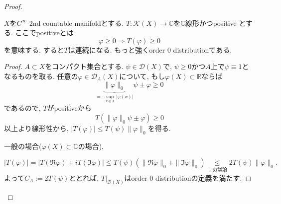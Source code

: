 \begin{proof}
\begin{tcolorbox}[mybox]
\begin{thm}
\end{thm}
\end{tcolorbox}

\begin{rem}
$X$を$C^{\infty}$ 2nd countable manifoldとする. 
$T:\mathcal{K}(X)\to \mathbb{C}$を$\mathbb{C}$線形かつpositive とする.
ここでpositiveとは
\[
\varphi\geq 0 \Rightarrow T(\varphi)\geq 0
\]
を意味する. すると$T$は連続になる. もっと強くorder $0$ distributionである. 
\begin{proof}
$A\subset X$をコンパクト集合とする. 
 $\psi\in \mathcal{D}(X)$で, $\psi\geq 0$かつ$A$上で$\psi \equiv 1$となるものを取る. 
任意の$\varphi\in \mathcal{D}_A(X)$について, 
もし$\varphi(X)\subset \mathbb{R}$ならば
\[
\underbrace{\|\varphi\|_0}_{=:\sup_{x\in X} |\varphi(x)|}\psi \pm \varphi \geq 0
\]
であるので, $T$がpositiveから
\[
T(\|\varphi\|_0\psi \pm \varphi)\geq 0
\]
以上より線形性から, 
\( |T(\varphi)|\leq T(\psi)\|\varphi\|_0
\)を得る.

一般の場合($\varphi(X)\subset \mathbb{C}$の場合), 

\[
|T(\varphi)|=\left|T(\Re\varphi)+iT(\Im\varphi)\right|
\leq T(\psi)(\|\Re\varphi\|_0+\|\Im\varphi\|_0)
\underset{\text{上の議論}}{\leq} 2T(\psi)\|\varphi\|_0.
\]
よって$C_A:=2T(\psi)$ととれば, $T|_{\mathcal{D}(X)}$はorder $0$ distributionの定義を満たす. 
\end{proof}
\end{rem}

\end{proof}



